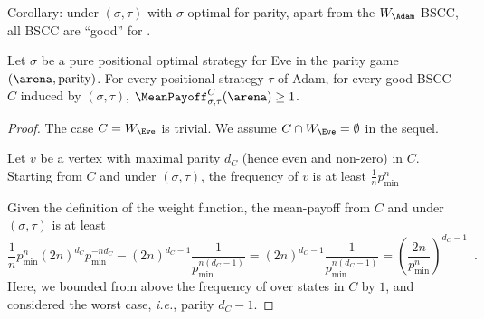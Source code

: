   Corollary: under $(\sigma,\tau)$ with $\sigma$ optimal for parity,
  apart from the $W_\Adam$ BSCC, all BSCC are ``good'' for \Eve.

\begin{lemma}
    Let $\sigma$ be a pure positional optimal strategy for Eve in
    the parity game $(\arena,\textrm{parity})$. For every positional
    strategy $\tau$ of Adam, for every good BSCC $C$ induced by
    $(\sigma,\tau)$, $\MeanPayoff_{\sigma,\tau}^C(\arena) \geq 1$.
\end{lemma}
\begin{proof}
    The case $C = W_\Eve$ is trivial. We assume
    $C \cap W_\Eve = \emptyset$ in the sequel.
    
    Let $v$ be a vertex with maximal parity $d_C$ (hence even and
    non-zero) in $C$. Starting from $C$ and under $(\sigma,\tau)$,
    the frequency of $v$ is at least $\frac{1}{n} p_{\min}^n$

    Given the definition of the weight function, the mean-payoff
    from $C$ and under $(\sigma,\tau)$ is at least
    \[
      \frac{1}{n} p_{\min}^n (2n)^{d_C} p_{\min}^{-n d_C} -
      (2n)^{d_C -1} \frac{1}{p_{\min}^{n (d_C-1)}} = (2n)^{d_C -1}
      \frac{1}{p_{\min}^{n (d_C-1)}} =
      (\frac{2n}{p_{\min}^n})^{d_C{-}1}\enspace.
    \]
    Here, we bounded from above the frequency of over states in $C$
    by $1$, and considered the worst case, \emph{i.e.}, parity
    $d_C-1$.
\end{proof}

